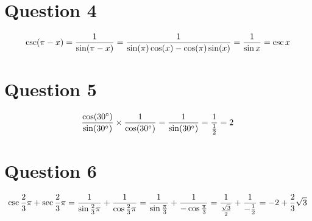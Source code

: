\documentclass{../../style}
\begin{document}
\begin{center}
		\section*{Question 4}
		\begin{dmath}
			\csc(\pi - x) = \reciprocal{\sin(\pi - x)} = \reciprocal{\sin(\pi)\cos(x) - \cos(\pi)\sin(x)} = \reciprocal{\sin x} = \csc x
		\end{dmath}

		\section*{Question 5}
		\begin{dmath}
			\frac{\cos(30\degree)}{\sin(30\degree)} \times \reciprocal{\cos(30\degree)} = \reciprocal{\sin(30\degree)} = \reciprocal{\reciprocal{2}} = 2
		\end{dmath}

		\section*{Question 6}
		\begin{dmath}
			\csc \frac{2}{3}\pi + \sec \frac{2}{3}\pi = \reciprocal{\sin \frac{2}{3}\pi} + \reciprocal{\cos \frac{2}{3}\pi} = \reciprocal{\sin \frac{\pi}{3}} + \reciprocal{-\cos \frac{\pi}{3}} = \reciprocal{\frac{\sqrt{3}}{2}} + \reciprocal{-\reciprocal{2}} = -2 + \frac{2}{3} \sqrt{3}
		\end{dmath}
	\end{center}
\end{document}
